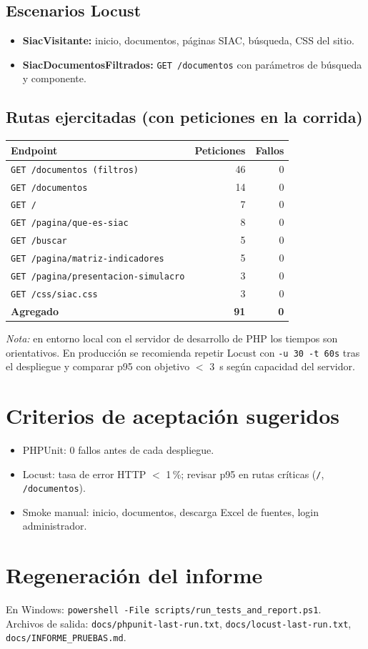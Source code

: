 \subsection{Escenarios Locust}
\begin{itemize}
  \item \textbf{SiacVisitante:} inicio, documentos, páginas SIAC, búsqueda, CSS del sitio.
  \item \textbf{SiacDocumentosFiltrados:} \texttt{GET /documentos} con parámetros de búsqueda y componente.
\end{itemize}

\subsection{Rutas ejercitadas (con peticiones en la corrida)}
\begin{table}[H]
  \centering
  \small
  \begin{tabular}{@{}lrr@{}}
    \toprule
    \textbf{Endpoint} & \textbf{Peticiones} & \textbf{Fallos} \\
    \midrule
    \texttt{GET /documentos (filtros)} & 46 & 0 \\
    \texttt{GET /documentos} & 14 & 0 \\
    \texttt{GET /} & 7 & 0 \\
    \texttt{GET /pagina/que-es-siac} & 8 & 0 \\
    \texttt{GET /buscar} & 5 & 0 \\
    \texttt{GET /pagina/matriz-indicadores} & 5 & 0 \\
    \texttt{GET /pagina/presentacion-simulacro} & 3 & 0 \\
    \texttt{GET /css/siac.css} & 3 & 0 \\
    \midrule
    \textbf{Agregado} & \textbf{91} & \textbf{0} \\
    \bottomrule
  \end{tabular}
\end{table}

\textit{Nota:} en entorno local con el servidor de desarrollo de PHP los tiempos son orientativos. En producción se recomienda repetir Locust con \texttt{-u 30 -t 60s} tras el despliegue y comparar p95 con objetivo $<$ 3~s según capacidad del servidor.

\section{Criterios de aceptación sugeridos}
\begin{itemize}
  \item PHPUnit: 0 fallos antes de cada despliegue.
  \item Locust: tasa de error HTTP $<$ 1\,\%; revisar p95 en rutas críticas (\texttt{/}, \texttt{/documentos}).
  \item Smoke manual: inicio, documentos, descarga Excel de fuentes, login administrador.
\end{itemize}

\section{Regeneración del informe}
En Windows: \texttt{powershell -File scripts/run\_tests\_and\_report.ps1}.\\
Archivos de salida: \texttt{docs/phpunit-last-run.txt}, \texttt{docs/locust-last-run.txt}, \texttt{docs/INFORME\_PRUEBAS.md}.
